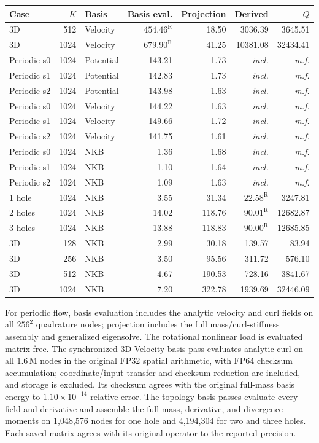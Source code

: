 \begin{table}[!htb]
\begin{tabular}{lrlrrrr}\toprule
Case&$K$&Basis&Basis eval.&Projection&Derived&$Q$\\\midrule
3D & 512 & Velocity & $454.46^{\mathrm R}$ & 18.50 & 3036.39 & 3645.51\\
3D & 1024 & Velocity & $679.90^{\mathrm R}$ & 41.25 & 10381.08 & 32434.41\\
Periodic s0 & 1024 & Potential & 143.21 & 1.73 & \textit{incl.} & \textit{m.f.}\\
Periodic s1 & 1024 & Potential & 142.83 & 1.73 & \textit{incl.} & \textit{m.f.}\\
Periodic s2 & 1024 & Potential & 143.98 & 1.63 & \textit{incl.} & \textit{m.f.}\\
Periodic s0 & 1024 & Velocity & 144.22 & 1.63 & \textit{incl.} & \textit{m.f.}\\
Periodic s1 & 1024 & Velocity & 149.66 & 1.72 & \textit{incl.} & \textit{m.f.}\\
Periodic s2 & 1024 & Velocity & 141.75 & 1.61 & \textit{incl.} & \textit{m.f.}\\
Periodic s0 & 1024 & NKB & 1.36 & 1.68 & \textit{incl.} & \textit{m.f.}\\
Periodic s1 & 1024 & NKB & 1.10 & 1.64 & \textit{incl.} & \textit{m.f.}\\
Periodic s2 & 1024 & NKB & 1.09 & 1.63 & \textit{incl.} & \textit{m.f.}\\
1 hole & 1024 & NKB & 3.55 & 31.34 & $22.58^{\mathrm R}$ & 3247.81\\
2 holes & 1024 & NKB & 14.02 & 118.76 & $90.01^{\mathrm R}$ & 12682.87\\
3 holes & 1024 & NKB & 13.88 & 118.83 & $90.00^{\mathrm R}$ & 12685.85\\
3D & 128 & NKB & 2.99 & 30.18 & 139.57 & 83.94\\
3D & 256 & NKB & 3.50 & 95.56 & 311.72 & 576.10\\
3D & 512 & NKB & 4.67 & 190.53 & 728.16 & 3841.67\\
3D & 1024 & NKB & 7.20 & 322.78 & 1939.69 & 32446.09\\
\bottomrule\end{tabular}\end{table}
For periodic flow, basis evaluation includes the analytic velocity and curl fields on all $256^2$ quadrature nodes; projection includes the full mass/curl-stiffness assembly and generalized eigensolve. The rotational nonlinear load is evaluated matrix-free.
The synchronized 3D Velocity basis pass evaluates analytic curl on all $1.6\,\mathrm{M}$ nodes in the original FP32 spatial arithmetic, with FP64 checksum accumulation; coordinate/input transfer and checksum reduction are included, and storage is excluded. Its checksum agrees with the original full-mass basis energy to $1.10\times10^{-14}$ relative error. The topology basis passes evaluate every field and derivative and assemble the full mass, derivative, and divergence moments on 1,048,576 nodes for one hole and 4,194,304 for two and three holes. Each saved matrix agrees with its original operator to the reported precision.




